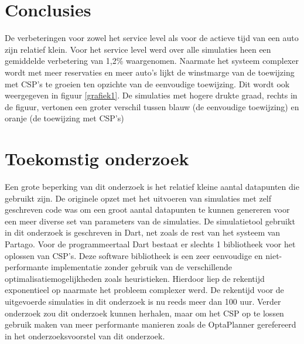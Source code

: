 \documentclass[a0,portrait]{a0poster}
\begin{document}
\begin{multicols}{2}



\color{HoGentAccent1} 
\section*{Conclusies}
\color{black}
De verbeteringen voor zowel het service level als voor de actieve tijd van een auto zijn relatief klein. Voor het service level werd over alle simulaties heen een gemiddelde verbetering van 1,2\% waargenomen. Naarmate het systeem complexer wordt met meer reservaties en meer auto's lijkt de winstmarge van de toewijzing met CSP's te groeien ten opzichte van de eenvoudige toewijzing. Dit wordt ook weergegeven in figuur \ref{grafiek1}. De simulaties met hogere drukte graad, rechts in de figuur, vertonen een groter verschil tussen blauw (de eenvoudige toewijzing) en oranje (de toewijzing met CSP's)
\color{HoGentAccent1} 
\section*{Toekomstig onderzoek}
\color{black}
Een grote beperking van dit onderzoek is het relatief kleine aantal datapunten die gebruikt zijn. De originele opzet met het uitvoeren van simulaties met zelf geschreven code was om een groot aantal datapunten te kunnen genereren voor een meer diverse set van parameters van de simulaties. De simulatietool gebruikt in dit onderzoek is geschreven in Dart, net zoals de rest van het systeem van Partago. Voor de programmeertaal Dart bestaat er slechts 1 bibliotheek voor het oplossen van CSP's. Deze software bibliotheek is een zeer eenvoudige en niet-performante implementatie zonder gebruik van de verschillende optimalisatiemogelijkheden zoals heuristieken. Hierdoor liep de rekentijd exponentieel op naarmate het probleem complexer werd. De rekentijd voor de uitgevoerde simulaties in dit onderzoek is nu reeds meer dan 100 uur. Verder onderzoek zou dit onderzoek kunnen herhalen, maar om het CSP op te lossen gebruik maken van meer performante manieren zoals de OptaPlanner gerefereerd in het onderzoeksvoorstel van dit onderzoek. 


\end{multicols}
\end{document}
